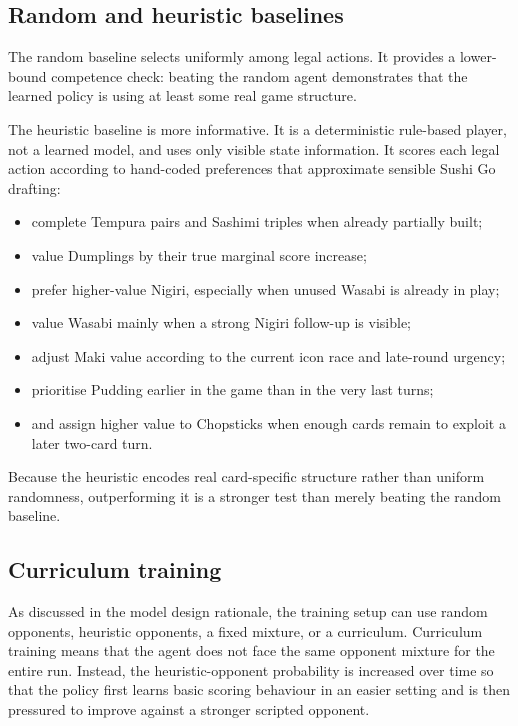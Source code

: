 \documentclass[10pt]{article}
\begin{document}
\subsection{Random and heuristic baselines}

The random baseline selects uniformly among legal actions. It provides a lower-bound competence check: beating the random agent demonstrates that the learned policy is using at least some real game structure.

The heuristic baseline is more informative. It is a deterministic rule-based player, not a learned model, and uses only visible state information. It scores each legal action according to hand-coded preferences that approximate sensible Sushi Go drafting:
\begin{itemize}
  \item complete Tempura pairs and Sashimi triples when already partially built;
  \item value Dumplings by their true marginal score increase;
  \item prefer higher-value Nigiri, especially when unused Wasabi is already in play;
  \item value Wasabi mainly when a strong Nigiri follow-up is visible;
  \item adjust Maki value according to the current icon race and late-round urgency;
  \item prioritise Pudding earlier in the game than in the very last turns;
  \item and assign higher value to Chopsticks when enough cards remain to exploit a later two-card turn.
\end{itemize}

Because the heuristic encodes real card-specific structure rather than uniform randomness, outperforming it is a stronger test than merely beating the random baseline.

\subsection{Curriculum training}

As discussed in the model design rationale, the training setup can use random opponents, heuristic opponents, a fixed mixture, or a curriculum. Curriculum training means that the agent does not face the same opponent mixture for the entire run. Instead, the heuristic-opponent probability is increased over time so that the policy first learns basic scoring behaviour in an easier setting and is then pressured to improve against a stronger scripted opponent.
\end{document}
